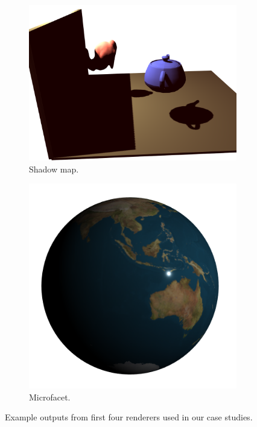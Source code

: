 \begin{figure}
	\begin{subfigure}[b]{0.45\linewidth}
		\centering
		\includegraphics[width=\linewidth]{fig/shadowmap.png}
		\caption{Shadow map.}
	\end{subfigure}
	\hfill
	\begin{subfigure}[b]{0.45\linewidth}
		\centering
		\includegraphics[width=\linewidth]{fig/microfacet.png}
		\caption{Microfacet.}
	\end{subfigure}
	\caption{Example outputs from first four renderers used in our case studies.}
\end{figure}
